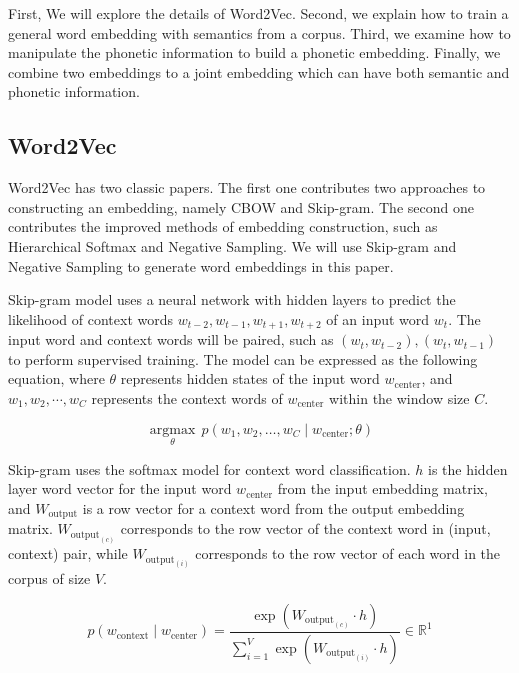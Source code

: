 First, We will explore the details of Word2Vec. Second, we explain how to train a general word embedding with semantics from a corpus. Third, we examine how to manipulate the phonetic information to build a phonetic embedding. Finally, we combine two embeddings to a joint embedding which can have both semantic and phonetic information.

\subsection{Word2Vec} \label{sec:word2vec}

Word2Vec has two classic papers. The first one \cite{mikolov2013efficient} contributes two approaches to constructing an embedding, namely CBOW and Skip-gram. The second one \cite{mikolov2013distributed} contributes the improved methods of embedding construction, such as Hierarchical Softmax and Negative Sampling. We will use Skip-gram and Negative Sampling to generate word embeddings in this paper.

Skip-gram model uses a neural network with hidden layers to predict the likelihood of context words $w_{t-2}, w_{t-1}, w_{t+1}, w_{t+2}$ of an input word $w_t$. The input word and context words will be paired, such as $(w_t, w_{t-2}), (w_t, w_{t-1})$ to perform supervised training. The model can be expressed as the following equation, where $\theta$ represents hidden states of the input word $w_\text{center}$, and $w_1, w_2, \cdots, w_C$ represents the context words of $w_\text{center}$ within the window size $C$. 


\begin{equation}
\underset{\theta}{\operatorname{argmax}} \, p\left(w_{1}, w_{2}, \ldots, w_{C} \mid w_{\text {center}} ; \theta\right)
\end{equation}

Skip-gram uses the softmax model for context word classification. $h$ is the hidden layer word vector for the input word $w_\text{center}$ from the input embedding matrix, and $W_{\text {output}}$ is a row vector for a context word from the output embedding matrix. $W_{\text {output}_{(c)}}$ corresponds to the row vector of the context word in (input, context) pair, while $W_{\text {output}_{(i)}}$ corresponds to the row vector of each word in the corpus of size $V$.

\begin{equation}
    p\left(w_{\text {context}} \mid w_{\text {center}}\right)=\frac{\exp \left(W_{\text {output}_{{(c)}}} \cdot h\right)}{\sum_{i=1}^{V} \exp \left(W_{\text {output}_{(i)}} \cdot h\right)} \in \mathbb{R}^{1}
\end{equation}

